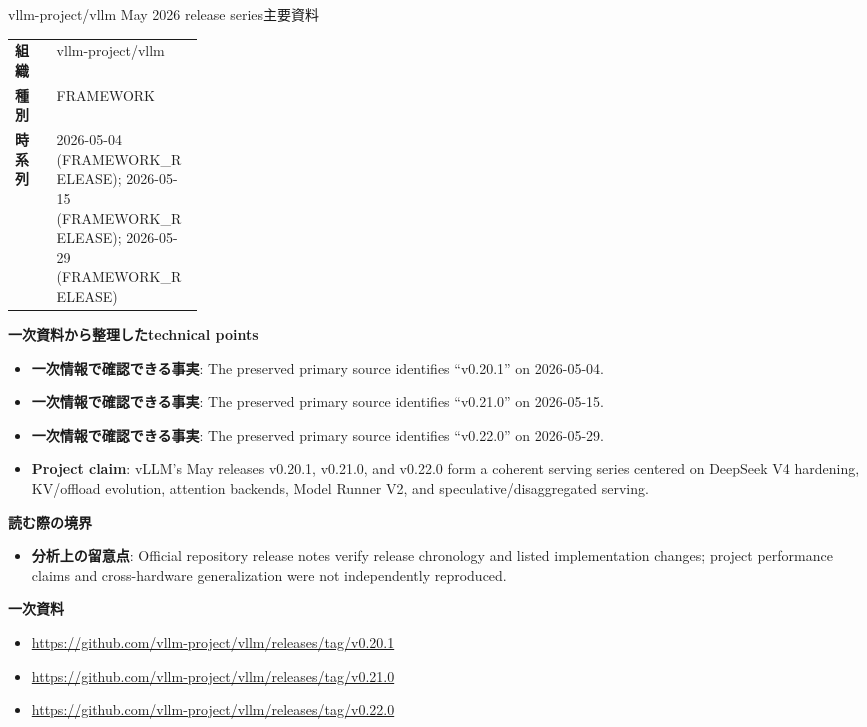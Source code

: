 \begin{technicalnote}{vllm-project/vllm May 2026 release series}{主要資料}
\begin{tabularx}{\linewidth}{@{}>{\bfseries}p{0.22\linewidth}X@{}}
組織 & vllm-project/vllm \\
種別 & FRAMEWORK \\
時系列 & 2026-05-04 (FRAMEWORK\_RELEASE); 2026-05-15 (FRAMEWORK\_RELEASE); 2026-05-29 (FRAMEWORK\_RELEASE) \\
\end{tabularx}
\smallskip
{\bfseries 一次資料から整理したtechnical points}
\begin{itemize}[leftmargin=1.5em,itemsep=0.35em]
\item \textbf{一次情報で確認できる事実}: The preserved primary source identifies “v0.20.1” on 2026-05-04.
\item \textbf{一次情報で確認できる事実}: The preserved primary source identifies “v0.21.0” on 2026-05-15.
\item \textbf{一次情報で確認できる事実}: The preserved primary source identifies “v0.22.0” on 2026-05-29.
\item \textbf{Project claim}: vLLM's May releases v0.20.1, v0.21.0, and v0.22.0 form a coherent serving series centered on DeepSeek V4 hardening, KV/offload evolution, attention backends, Model Runner V2, and speculative/disaggregated serving.
\end{itemize}
{\bfseries 読む際の境界}
\begin{itemize}[leftmargin=1.5em,itemsep=0.35em]
\item \textbf{分析上の留意点}: Official repository release notes verify release chronology and listed implementation changes; project performance claims and cross-hardware generalization were not independently reproduced.
\end{itemize}
{\bfseries 一次資料}
\begingroup\sloppy
\begin{itemize}[leftmargin=1.5em,itemsep=0.25em]
\item {\scriptsize\url{https://github.com/vllm-project/vllm/releases/tag/v0.20.1}}
\item {\scriptsize\url{https://github.com/vllm-project/vllm/releases/tag/v0.21.0}}
\item {\scriptsize\url{https://github.com/vllm-project/vllm/releases/tag/v0.22.0}}
\end{itemize}
\endgroup
\end{technicalnote}
\medskip


